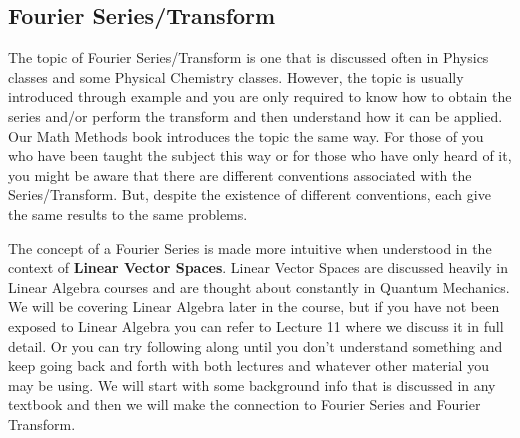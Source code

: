 \documentclass{article}
\begin{document}
\subsection*{Fourier Series/Transform}
The topic of Fourier Series/Transform is one that is discussed often in Physics classes and some Physical Chemistry classes.
However, the topic is usually introduced through example and you are only required to know how to obtain the series and/or perform the transform and then understand how it can be applied.
Our Math Methods book introduces the topic the same way.
For those of you who have been taught the subject this way or for those who have only heard of it, you might be aware that there are different conventions associated with the Series/Transform.
But, despite the existence of different conventions, each give the same results to the same problems.

The concept of a Fourier Series is made more intuitive when understood in the context of \textbf{Linear Vector Spaces}.
Linear Vector Spaces are discussed heavily in Linear Algebra courses and are thought about constantly in Quantum Mechanics.
We will be covering Linear Algebra later in the course, but if you have not been exposed to Linear Algebra you can refer to Lecture 11 where we discuss it in full detail.
Or you can try following along until you don't understand something and keep going back and forth with both lectures and whatever other material you may be using.
We will start with some background info that is discussed in any textbook and then we will make the connection to Fourier Series and Fourier Transform.
\end{document}
